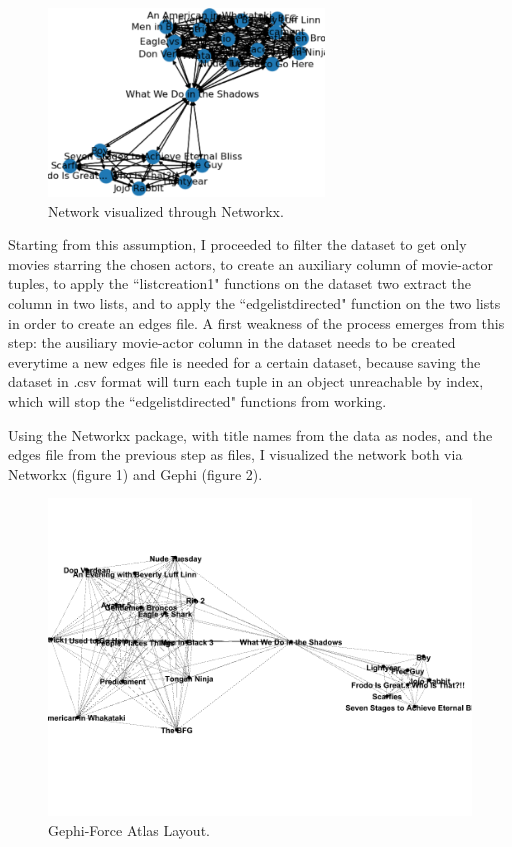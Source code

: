 \documentclass[11pt]{article}
\begin{document}
\begin{figure}[h!]
\centering
\includegraphics[height=5cm]{py3.png}
\caption{Network visualized through Networkx.}
\label{fig:network1}
\end{figure}

Starting from this assumption, I proceeded to filter the dataset to get only movies starring the chosen actors, to create an auxiliary column of movie-actor tuples, to apply the ``listcreation1" functions on the dataset two extract the column in two lists, and to apply the ``edgelistdirected" function on the two lists in order to create an edges file. A first weakness of the process emerges from this step: the ausiliary movie-actor column in the dataset needs to be created everytime a new edges file is needed for a certain dataset, because saving the dataset in .csv format will turn each tuple in an object unreachable by index, which will stop the ``edgelistdirected" functions from working. 

Using the Networkx package, with title names from the data as nodes, and the edges file from the previous step as files, I visualized the network both via Networkx (figure 1) and Gephi (figure 2).



\begin{figure}[h!]
\centering
\includegraphics[height= 6 cm]{taikajem.png}
\caption{Gephi-Force Atlas Layout.}
\label{fig:netowrk2}
\end{figure}
\end{document}

